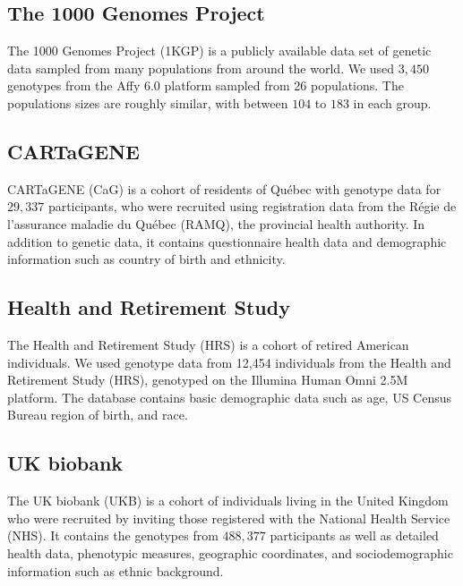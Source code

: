 %    

\subsection{The 1000 Genomes Project}

The 1000 Genomes Project (1KGP) is a publicly available data set of genetic data sampled from many populations from around the world\citep{global_2015}. We used $3,450$ genotypes from the Affy 6.0 platform sampled from $26$  populations. The populations sizes are roughly similar, with between $104$ to $183$ in each group.

\subsection{CARTaGENE}

CARTaGENE (CaG) is a cohort of residents of Qu\'{e}bec with genotype data for $29,337$ participants, who were recruited using registration data from the R\'{e}gie de l’assurance maladie du Qu\'{e}bec (RAMQ), the provincial health authority\citep{awadalla_cohort_2013}. In addition to genetic data, it contains questionnaire health data and demographic information such as country of birth and ethnicity.

\subsection{Health and Retirement Study}

The Health and Retirement Study (HRS) is a cohort of retired American individuals\citep{juster_overview_1995}. We used genotype data from 12,454 individuals from the Health and Retirement Study (HRS), genotyped on the Illumina Human Omni 2.5M platform. The database contains basic demographic data such as age, US Census Bureau region of birth, and race.

\subsection{UK biobank}

The UK biobank (UKB) is a cohort of individuals living in the United Kingdom who were recruited by inviting those registered with the National Health Service (NHS)\citep{sudlow_uk_2015}. It contains the genotypes from $488,377$ participants as well as detailed health data, phenotypic measures, geographic coordinates, and sociodemographic information such as ethnic background.

